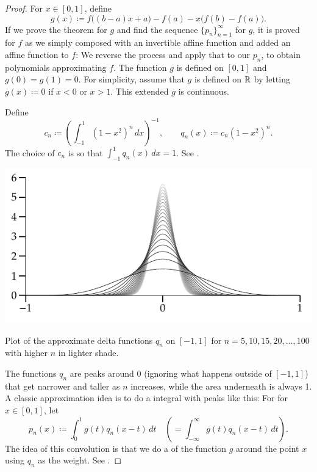 \begin{proof}
For $x \in [0,1]$,
define
\begin{equation*}
g(x) \coloneqq f\bigl((b-a)x+a\bigr)-f(a) - x\bigl(f(b)-f(a)\bigr) .
\end{equation*}
If we prove the theorem for $g$ and find the sequence
$\{ p_n \}_{n=1}^\infty$ for $g$,
it is proved for $f$ as we simply
composed with an invertible affine function and added an affine
function to $f$:  We reverse the process and apply that to our
$p_n$, to obtain polynomials approximating $f$.
The function $g$ is defined on $[0,1]$ and $g(0)=g(1)=0$.
For simplicity, assume that
$g$ is defined on ${\mathbb{R}}$ by letting
$g(x) \coloneqq 0$ if $x < 0$ or $x > 1$.  This extended $g$ is continuous.

Define
\begin{equation*}
c_n \coloneqq {\left( \int_{-1}^1 {(1-x^2)}^n\,dx \right)}^{-1} ,
\qquad
q_n(x) \coloneqq c_n (1-x^2)^n .
\end{equation*}
The choice of $c_n$ is
so that $\int_{-1}^1 q_n(x)\,dx = 1$.
See .

\begin{myfigureht}
\includegraphics{figures/weierqn}
\caption{Plot of the approximate delta functions $q_n$ on $[-1,1]$ for
$n=5,10,15,20,\ldots,100$ with higher $n$ in lighter shade.\label{fig:weierqn}}
\end{myfigureht}

The functions $q_n$ are peaks around 0 (ignoring what happens outside
of $[-1,1]$) that get narrower and taller as $n$ increases,
while the area underneath is always 1.
A classic approximation idea
is to do a \emph{} integral with peaks like this:
For
for $x \in [0,1]$, let
\begin{equation*}
p_n(x) \coloneqq \int_{0}^1 g(t)q_n(x-t) \,dt \quad \left( = \int_{-\infty}^\infty
g(t)q_n(x-t) \,dt \right) .
\end{equation*}
The idea of this convolution is that we do a  of the
function $g$ around the point $x$ using $q_n$ as the weight.
See .


\end{proof}
